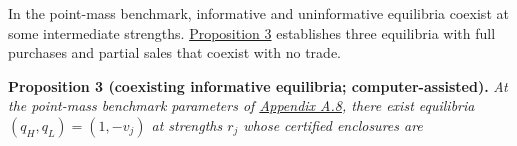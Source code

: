 In the point-mass benchmark, informative and uninformative equilibria
coexist at some intermediate strengths.
\hyperref[result-proposition-3]{Proposition 3} establishes three
equilibria with full purchases and partial sales that coexist with no
trade.


\protect{}\label{result-proposition-3}{\textbf{Proposition
3 (coexisting informative equilibria; computer-assisted).}} \emph{At the
point-mass benchmark parameters of \hyperref[pa-parameters]{Appendix
A.8}, there exist equilibria \((q_H,q_L)=(1,-v_j)\) at strengths
\(r_j\) whose certified enclosures are}

